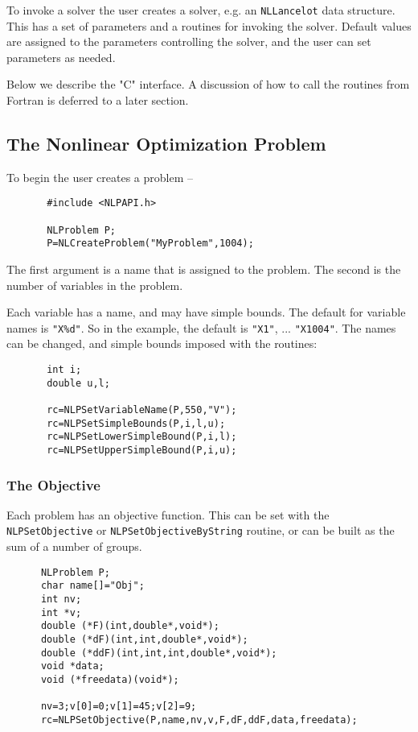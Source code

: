\documentclass[12pt]{article}
\begin{document}
     To invoke a solver the user creates a solver, e.g. an {\tt NLLancelot} data structure.
    This has a set of parameters and a routines for invoking the solver.
    Default values are assigned to the parameters controlling the solver, and the user 
    can set parameters as needed.

    Below we describe the "C" interface. A discussion of how to call the routines from Fortran 
    is deferred to a later section.

   \subsection{The Nonlinear Optimization Problem}

     To begin the user creates a problem --
     \begin{verbatim}
       #include <NLPAPI.h>

       NLProblem P;
       P=NLCreateProblem("MyProblem",1004);
     \end{verbatim}
     The first argument is a name that is assigned to the problem. The second is the number of variables in 
     the problem.

     Each variable has a name, and may have simple bounds. The default for variable names is {\tt "X\%d"}. So in the
     example, the default is {\tt "X1"}, ... {\tt "X1004"}. The names can be changed, and simple bounds imposed with
     the routines:
     \begin{verbatim}
       int i;
       double u,l;

       rc=NLPSetVariableName(P,550,"V");
       rc=NLPSetSimpleBounds(P,i,l,u);
       rc=NLPSetLowerSimpleBound(P,i,l);
       rc=NLPSetUpperSimpleBound(P,i,u);
     \end{verbatim}

   \subsubsection{The Objective}

     Each problem has an objective function. This can be set with the {\tt NLPSet\-Objective} or
     {\tt NLPSet\-Objective\-ByString} routine, or can be built as the sum of a number of groups.
     \begin{verbatim}
      NLProblem P;
      char name[]="Obj";
      int nv;
      int *v;
      double (*F)(int,double*,void*);
      double (*dF)(int,int,double*,void*);
      double (*ddF)(int,int,int,double*,void*);
      void *data;
      void (*freedata)(void*);

      nv=3;v[0]=0;v[1]=45;v[2]=9;
      rc=NLPSetObjective(P,name,nv,v,F,dF,ddF,data,freedata);
     \end{verbatim}
\end{document}
